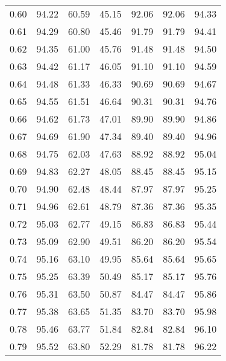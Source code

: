 \begin{tabular}{|c|c|c|c|c|c|c|}
      0.60 &     94.22 &     60.59 &      45.15 &   92.06 &      92.06 &         94.33 \\
      0.61 &     94.29 &     60.80 &      45.46 &   91.79 &      91.79 &         94.41 \\
      0.62 &     94.35 &     61.00 &      45.76 &   91.48 &      91.48 &         94.50 \\
      0.63 &     94.42 &     61.17 &      46.05 &   91.10 &      91.10 &         94.59 \\
      0.64 &     94.48 &     61.33 &      46.33 &   90.69 &      90.69 &         94.67 \\
      0.65 &     94.55 &     61.51 &      46.64 &   90.31 &      90.31 &         94.76 \\
      0.66 &     94.62 &     61.73 &      47.01 &   89.90 &      89.90 &         94.86 \\
      0.67 &     94.69 &     61.90 &      47.34 &   89.40 &      89.40 &         94.96 \\
      0.68 &     94.75 &     62.03 &      47.63 &   88.92 &      88.92 &         95.04 \\
      0.69 &     94.83 &     62.27 &      48.05 &   88.45 &      88.45 &         95.15 \\
      0.70 &     94.90 &     62.48 &      48.44 &   87.97 &      87.97 &         95.25 \\
      0.71 &     94.96 &     62.61 &      48.79 &   87.36 &      87.36 &         95.35 \\
      0.72 &     95.03 &     62.77 &      49.15 &   86.83 &      86.83 &         95.44 \\
      0.73 &     95.09 &     62.90 &      49.51 &   86.20 &      86.20 &         95.54 \\
      0.74 &     95.16 &     63.10 &      49.95 &   85.64 &      85.64 &         95.65 \\
      0.75 &     95.25 &     63.39 &      50.49 &   85.17 &      85.17 &         95.76 \\
      0.76 &     95.31 &     63.50 &      50.87 &   84.47 &      84.47 &         95.86 \\
      0.77 &     95.38 &     63.65 &      51.35 &   83.70 &      83.70 &         95.98 \\
      0.78 &     95.46 &     63.77 &      51.84 &   82.84 &      82.84 &         96.10 \\
      0.79 &     95.52 &     63.80 &      52.29 &   81.78 &      81.78 &         96.22 \\

\end{tabular}
